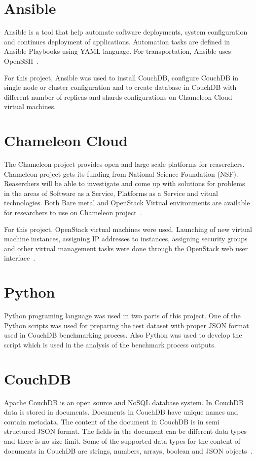 \section{Ansible}
Ansible is a tool that help automate software deployments, system
configuration and continues deployment of applications. Automation
tasks are defined in Ansible Playbooks using YAML language. For
transportation, Ansible uses OpenSSH~\cite{www-Ansible}. 

For this project, Ansible was used to install CouchDB, configure
CouchDB in single node or cluster configuration and to create database
in CouchDB with different number of replicas and shards configurations on
Chameleon Cloud virtual machines.

\section{Chameleon Cloud}

The Chameleon project provides open and large scale platforms for
reaserchers. Chameleon project gets its funding from National Science
Foundation (NSF). Reaserchers will be able to investigate and come up
with solutions for problems in the areas of Software as a Service, Platforms as a
Service and vitual technologies. Both Bare metal and OpenStack Virtual
environments are available for researchers to use on Chameleon
project~\cite{www-Chameleon}. 

For this project, OpenStack virtual machines were used. Launching of
new  virtual machine instances, assigning IP addresses to instances,
assigning security groups and other virtual management tasks were done
through the OpenStack web user interface~\cite{www-ChameleonDoc}. 


\section{Python}

Python programing language was used in two parts of this project. One
of the Python scripts was used for  preparing the test dataset with proper JSON format
used in CouchDB benchmarking process. Also Python was used to develop
the script which is used in the analysis of the benchmark process outputs.

\section{CouchDB}

Apache CouchDB is an open source and NoSQL database system. In CouchDB
data is stored in documents. Documents in CouchDB have unique names and contain
metadata. The content of the document in CouchDB is in semi structured
JSON format. The fields in the document can be different data types and there is no size
limit. Some of the supported data types for the content of documents
in CouchDB are strings, numbers, arrays, boolean and JSON objects~\cite{www-Couchdb}. 

